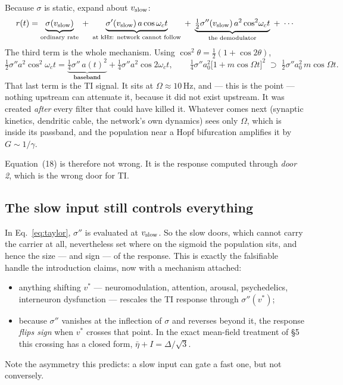\documentclass[11pt,a4paper]{article}
\begin{document}
Because $\sigma$ is static, expand about $v_{\rm slow}$:
\begin{equation}
r(t)=\underbrace{\sigma(v_{\rm slow})}_{\text{ordinary rate}}
\;+\;\underbrace{\sigma'(v_{\rm slow})\,a\cos\omega_c t}_{\text{at kHz: network cannot follow}}
\;+\;\underbrace{\tfrac12\sigma''(v_{\rm slow})\,a^2\cos^2\!\omega_c t}_{\text{the demodulator}}
\;+\;\cdots
\label{eq:taylor}
\end{equation}
The third term is the whole mechanism. Using $\cos^2\theta=\tfrac12(1+\cos2\theta)$,
\begin{equation}
\tfrac12\sigma''a^2\cos^2\!\omega_ct
=\underbrace{\tfrac14\sigma''\,a(t)^2}_{\textbf{baseband}}+\tfrac14\sigma''a^2\cos2\omega_ct ,
\qquad
\tfrac14\sigma''a_0^2\bigl[1+m\cos\Omega t\bigr]^2
\;\supset\;
\tfrac12\sigma''a_0^2\,m\cos\Omega t .
\end{equation}
That last term is the TI signal. It sits at $\Omega\approx10$\,Hz, and --- this is the point --- nothing
upstream can attenuate it, because it did not exist upstream. It was created \emph{after} every filter
that could have killed it. Whatever comes next (synaptic kinetics, dendritic cable, the network's own
dynamics) sees only $\Omega$, which is inside its passband, and the population near a Hopf bifurcation
amplifies it by $G\sim1/\gamma$.

Equation~(18) is therefore not wrong. It is the response computed through \emph{door 2}, which is the
wrong door for TI.

\subsection{The slow input still controls everything}

In Eq.~\eqref{eq:taylor}, $\sigma''$ is evaluated at $v_{\rm slow}$. So the slow doors, which cannot
carry the carrier at all, nevertheless set where on the sigmoid the population sits, and hence the size
--- and sign --- of the response. This is exactly the falsifiable handle the introduction claims, now
with a mechanism attached:
\begin{itemize}[leftmargin=1.4em,itemsep=1pt,topsep=2pt]
\item anything shifting $v^*$ --- neuromodulation, attention, arousal, psychedelics, interneuron
      dysfunction --- rescales the TI response through $\sigma''(v^*)$;
\item because $\sigma''$ vanishes at the inflection of $\sigma$ and reverses beyond it, the response
      \emph{flips sign} when $v^*$ crosses that point. In the exact mean-field treatment of \S5 this
      crossing has a closed form, $\bar\eta+I=\Delta/\sqrt3$.
\end{itemize}
Note the asymmetry this predicts: a slow input can gate a fast one, but not conversely.
\end{document}
